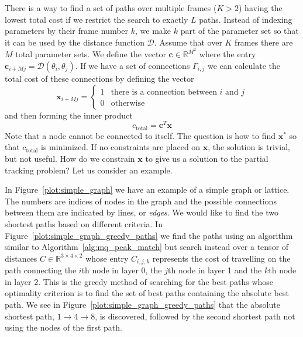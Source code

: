 \documentclass[letterpaper,12pt]{report}
\begin{document}
There is a way to find a set of paths over multiple frames ($K > 2$) having the
lowest total cost if
we restrict the search to exactly $L$ paths. Instead of indexing parameters by
their frame number $k$, we make $k$ part of the parameter set so that it can be
used by the distance function $\mathcal{D}$. Assume that over $K$ frames there
are $M$ total parameter sets. We define the vector $\boldsymbol{c} \in \mathbb{R}^{M^2}$
where the entry $\boldsymbol{c}_{i + Mj} = \mathcal{D} \left( \theta_{i}, \theta_{j}
\right)$. If we have a set of connections $\Gamma_{i,j}$ we can calculate the
total cost of these connections by defining the vector
\[
    \boldsymbol{x}_{i + Mj} = \begin{cases}
        1 & \text{there is a connection between }i\text{ and }j\\
        0 & \text{otherwise}
    \end{cases}
\]
and then forming the inner product
\[
    c_{\text{total}}=\boldsymbol{c}^{T}\boldsymbol{x}
\]
Note that a node cannot be connected to itself. The question is how to find
$\boldsymbol{x}^{\ast}$ so that $c_{\text{total}}$ is minimized. If no
constraints are placed on $\boldsymbol{x}$, the solution is trivial, but not
useful. How do we constrain $\boldsymbol{x}$ to give us a solution to the
partial tracking problem? Let us consider an example.

In Figure~\ref{plot:simple_graph} we have an example of a simple graph or
lattice. The numbers are indices of nodes in the graph and the possible
connections between them are indicated by lines, or \textit{edges}. We would like to find the two
shortest paths based on different criteria. In
Figure~\ref{plot:simple_graph_greedy_paths} we find the paths using an algorithm
similar to Algorithm~\ref{alg:mq_peak_match} but search instead over a tensor
of distances $C \in \mathbb{R}^{3 \times 4 \times 2}$ whose entry $C_{i,j,k}$
represents the cost of travelling on the path connecting the $i$th node in layer
0, the $j$th node in layer 1 and the $k$th node in layer 2. This is the greedy
method of searching for the best paths whose optimality criterion is to find the
set of best paths containing the absolute best path. We see in
Figure~\ref{plot:simple_graph_greedy_paths} that the absolute shortest path, $1
\rightarrow 4 \rightarrow 8$, is discovered, followed by the second shortest
path not using the nodes of the first path.
\end{document}
